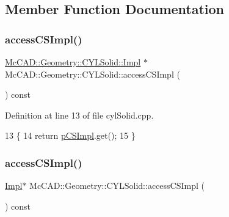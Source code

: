 \subsection{Member Function Documentation}
\mbox{\label{classMcCAD_1_1Geometry_1_1CYLSolid_ac62f8a08c4db70c97c980a131207452d}} 
\subsubsection{\texorpdfstring{access\+C\+S\+Impl()}{accessCSImpl()}\hspace{0.1cm}{\footnotesize\ttfamily [1/2]}}
{\footnotesize\ttfamily \hyperlink{classMcCAD_1_1Geometry_1_1CYLSolid_1_1Impl}{Mc\+C\+A\+D\+::\+Geometry\+::\+C\+Y\+L\+Solid\+::\+Impl} $\ast$ Mc\+C\+A\+D\+::\+Geometry\+::\+C\+Y\+L\+Solid\+::access\+C\+S\+Impl (\begin{DoxyParamCaption}{ }\end{DoxyParamCaption}) const}



Definition at line 13 of file cyl\+Solid.\+cpp.


\begin{DoxyCode}
13                                          \{
14   \textcolor{keywordflow}{return} \hyperlink{classMcCAD_1_1Geometry_1_1CYLSolid_ae0aadc232a3721a7246cbfa0348c7c0b}{pCSImpl}.get();
15 \}
\end{DoxyCode}
\mbox{\label{classMcCAD_1_1Geometry_1_1CYLSolid_aa03de7d587fa2bb9ddd1c4e0dab11b19}} 
\subsubsection{\texorpdfstring{access\+C\+S\+Impl()}{accessCSImpl()}\hspace{0.1cm}{\footnotesize\ttfamily [2/2]}}
{\footnotesize\ttfamily \hyperlink{classMcCAD_1_1Geometry_1_1CYLSolid_1_1Impl}{Impl}$\ast$ Mc\+C\+A\+D\+::\+Geometry\+::\+C\+Y\+L\+Solid\+::access\+C\+S\+Impl (\begin{DoxyParamCaption}{ }\end{DoxyParamCaption}) const}

